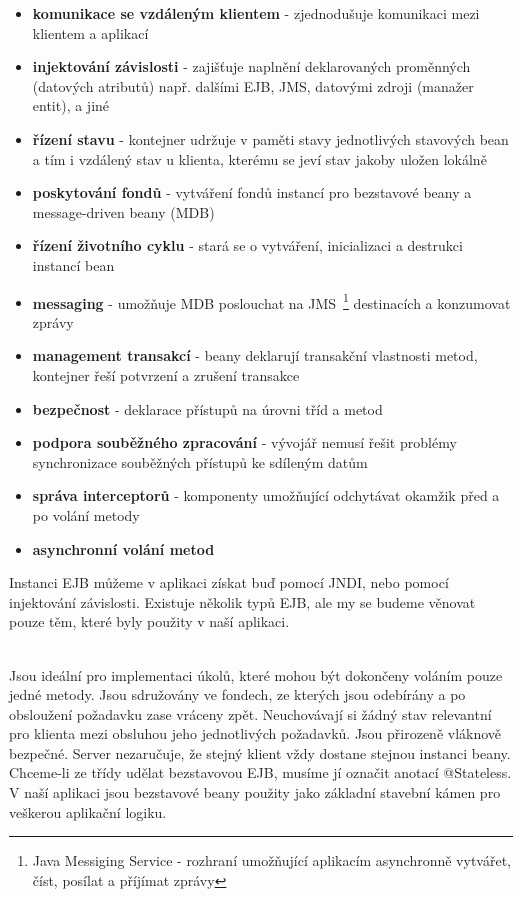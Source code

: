 \documentclass[122pt,oneside]{fithesis}
\begin{document}
\begin{itemize}
  \item {\bf komunikace se vzdáleným klientem} - zjednodušuje komunikaci mezi klientem a aplikací
  \item {\bf injektování závislosti} - zajišťuje naplnění deklarovaných proměnných (datových atributů) např. dalšími EJB, JMS, datovými zdroji (manažer entit), a jiné
  \item {\bf řízení stavu} - kontejner udržuje v paměti stavy jednotlivých stavových bean a tím i vzdálený stav u klienta, kterému se jeví stav jakoby uložen lokálně
  \item {\bf poskytování fondů} - vytváření fondů instancí pro bezstavové beany a message-driven beany (MDB)
  \item {\bf řízení životního cyklu} - stará se o vytváření, inicializaci a destrukci instancí bean
  \item {\bf messaging} - umožňuje MDB poslouchat na JMS~\footnote{Java Messiging Service - rozhraní umožňující aplikacím asynchronně vytvářet, číst, posílat a příjímat zprávy} destinacích a konzumovat zprávy
  \item {\bf management transakcí} - beany deklarují transakční vlastnosti metod, kontejner řeší potvrzení a zrušení transakce
  \item {\bf bezpečnost} - deklarace přístupů na úrovni tříd a metod
  \item {\bf podpora souběžného zpracování} - vývojář nemusí řešit problémy synchronizace souběžných přístupů ke sdíleným datům
  \item {\bf správa interceptorů} - komponenty umožňující odchytávat okamžik před a po volání metody
  \item {\bf asynchronní volání metod} 
\end{itemize}

Instanci EJB můžeme v aplikaci získat buď pomocí JNDI, nebo pomocí injektování závislosti.
Existuje několik typů EJB, ale my se budeme věnovat pouze těm, které byly použity v naší aplikaci.

\vspace{5 mm}
\\\indent Jsou ideální pro implementaci úkolů, které mohou být dokončeny voláním pouze jedné metody. Jsou sdružovány ve fondech, ze kterých jsou odebírány a po obsloužení požadavku zase vráceny zpět. Neuchovávají si žádný stav relevantní pro klienta mezi obsluhou jeho jednotlivých požadavků. Jsou přirozeně vláknově bezpečné. Server nezaručuje, že stejný klient vždy dostane stejnou instanci beany. Chceme-li ze třídy udělat bezstavovou EJB, musíme jí označit anotací @Stateless. V naší aplikaci jsou bezstavové beany použity jako základní stavební kámen pro veškerou aplikační logiku.
\end{document}
